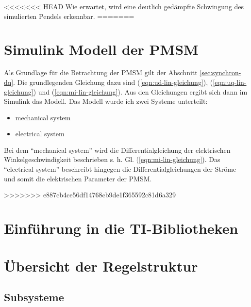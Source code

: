 <<<<<<< HEAD
Wie erwartet, wird eine deutlich gedämpfte Schwingung des simulierten Pendels erkennbar.
=======
\section{Simulink Modell der PMSM}\label{sec:math-model-pmsm}

Als Grundlage für die Betrachtung der PMSM gilt der Abschnitt \ref{sec:synchron-dq}.
Die grundlegenden Gleichung dazu sind (\ref{eqn:ud-lin-gleichung}), (\ref{eqn:uq-lin-gleichung}) und (\ref{eqn:mi-lin-gleichung}).
Aus den Gleichungen ergibt sich dann im Simulink das Modell.
Das Modell wurde ich zwei Systeme unterteilt:

\begin{itemize}
	\item mechanical system
	\item electrical system
\end{itemize}

Bei dem \enquote{mechanical system} wird die Differentialgleichung der elektrischen Winkelgeschwindigkeit beschrieben s. h. Gl. (\ref{eqn:mi-lin-gleichung}).
Das \enquote{electrical system} beschreibt hingegen die Differentialgleichungen der Ströme und somit die elektrischen Parameter der PMSM.


>>>>>>> e887cb4ce56df14768cb9de1f365592c81d6a329

\section{Einführung in die TI-Bibliotheken}\label{sec:TI}

\section{Übersicht der Regelstruktur}\label{sec:ueberregelung}

\subsection{Subsysteme}





